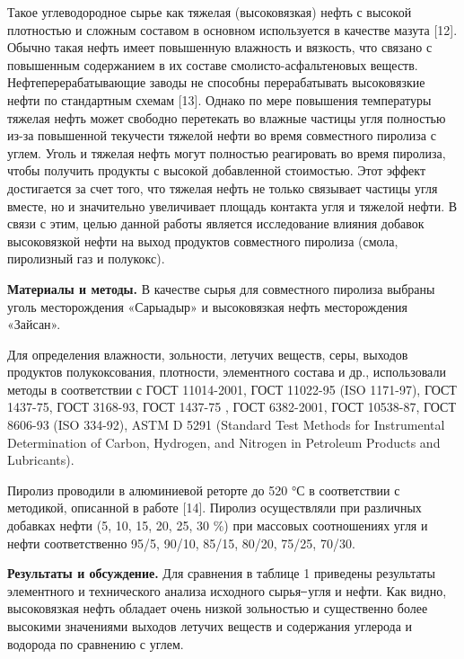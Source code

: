 \begin{multicols}{2}
Такое углеводородное сырье как тяжелая (высоковязкая) нефть с высокой
плотностью и сложным составом в основном используется в качестве мазута
{[}12{]}. Обычно такая нефть имеет повышенную влажность и вязкость, что
связано с повышенным содержанием в их составе смоли­сто-асфальтеновых
веществ. Нефтеперерабатывающие заводы не способны перерабатывать
высоковязкие нефти по стандартным схемам {[}13{]}. Однако по мере
повышения температуры тяжелая нефть может свободно перетекать во влажные
частицы угля полностью из-за повышенной текучести тяжелой нефти во время
совместного пиролиза с углем. Уголь и тяжелая нефть могут полностью
реагировать во время пиролиза, чтобы получить продукты с высокой
добавленной стоимостью. Этот эффект достигается за счет того, что
тяжелая нефть не только связывает частицы угля вместе, но и значительно
увеличивает площадь контакта угля и тяжелой нефти. В связи с этим, целью
данной работы является исследование влияния добавок высоковязкой нефти
на выход продуктов совместного пиролиза (смола, пиролизный газ и
полукокс).

{\bfseries Материалы и методы.} В качестве сырья для совместного пиролиза
выбраны уголь месторождения «Сарыадыр» и высоковязкая нефть
месторождения «Зайсан».

Для определения влажности, зольности, летучих веществ, серы, выходов
продуктов полукоксования, плотности, элементного состава и др.,
использовали методы в соответствии с ГОСТ 11014-2001, ГОСТ 11022-95 (ISO
1171-97), ГОСТ 1437-75, ГОСТ 3168-93, ГОСТ 1437-75 , ГОСТ 6382-2001,
ГОСТ 10538-87, ГОСТ 8606-93 (ISO 334-92), ASTM D 5291 (Standard Test
Methods for Instrumental Determination of Carbon, Hydrogen, and Nitrogen
in Petroleum Products and Lubricants).

Пиролиз проводили в алюминиевой реторте до 520 °С в соответствии с
методикой, описанной в работе {[}14{]}. Пиролиз осуществляли при
различных добавках нефти (5, 10, 15, 20, 25, 30 \%) при массовых
соотношениях угля и нефти соответственно 95/5, 90/10, 85/15, 80/20,
75/25, 70/30.

{\bfseries Результаты и обсуждение.} Для сравнения в таблице 1 приведены
результаты элементного и технического анализа исходного сырья ̶ угля и
нефти. Как видно, высоковязкая нефть обладает очень низкой зольностью и
существенно более высокими значениями выходов летучих веществ и
содержания углерода и водорода по сравнению с углем.


\end{multicols}
